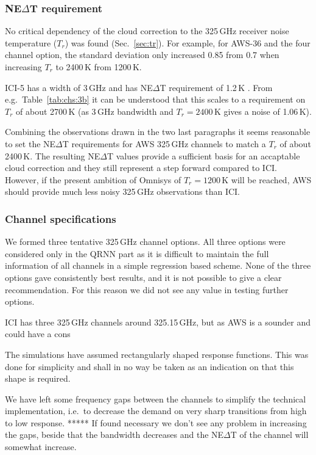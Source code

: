 \documentclass[12pt]{article}
\begin{document}
\subsubsection{NE$\Delta$T requirement}
%
No critical dependency of the cloud correction to the 325\,GHz receiver noise
temperature ($T_r$) was found (Sec.~\ref{sec:tr}). For example, for AWS-36 and
the four channel option, the standard deviation only increased 0.85 from 0.7
when increasing $T_r$ to 2400\,K from 1200\,K.

ICI-5 has a width of 3\,GHz and has NE$\Delta$T requirement of 1.2\,K
\citep{eriksson:towar:20}. From e.g.\ Table~\ref{tab:chs:3b} it can be
understood that this scales to a requirement on $T_r$ of about 2700\,K (as
3\,GHz bandwidth and $T_r=2400$\,K gives a noise of 1.06\,K).

Combining the observations drawn in the two last paragraphs it seems reasonable
to set the NE$\Delta$T requirements for AWS 325\,GHz channels to match a $T_r$
of about 2400\,K. The resulting NE$\Delta$T values provide a sufficient basis
for an accaptable cloud correction and they still represent a step forward
compared to ICI. However, if the present ambition of Omnisys of $T_r=1200$\,K
will be reached, AWS should provide much less noisy 325\,GHz observations than
ICI.



\subsubsection{Channel specifications}
%
We formed three tentative 325\,GHz channel options. All three options were
considered only in the QRNN part as it is difficult to maintain the full
information of all channels in a simple regression based scheme. None of the
three options gave consistently best results, and it is not possible to give a
clear recommendation. For this reason we did not see any value in testing
further options.

ICI has three 325\,GHz channels around 325.15\,GHz, but as AWS is a sounder and
could have a cons




The simulations have assumed rectangularly shaped response functions. This was
done for simplicity and shall in no way be taken as an indication on that this
shape is required.

We have left some frequency gaps between the channels to simplify the technical
implementation, i.e.\ to decrease the demand on very sharp transitions from high
to low response. ***** If found necessary we don't see
any problem in increasing the gaps, beside that the bandwidth decreases and the
NE$\Delta$T of the channel will somewhat increase.
\end{document}
